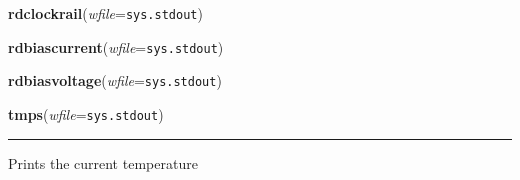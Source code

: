     \vspace{0.5ex}

    \begin{boxedminipage}{\textwidth}

    \raggedright \textbf{rdclockrail}(\textit{wfile}=\texttt{sys.stdout})

    \end{boxedminipage}

    \label{words:rdbiascurrent}

    \vspace{0.5ex}

    \begin{boxedminipage}{\textwidth}

    \raggedright \textbf{rdbiascurrent}(\textit{wfile}=\texttt{sys.stdout})

    \end{boxedminipage}

    \label{words:rdbiasvoltage}

    \vspace{0.5ex}

    \begin{boxedminipage}{\textwidth}

    \raggedright \textbf{rdbiasvoltage}(\textit{wfile}=\texttt{sys.stdout})

    \end{boxedminipage}

    \label{words:tmps}

    \vspace{0.5ex}

    \begin{boxedminipage}{\textwidth}

    \raggedright \textbf{tmps}(\textit{wfile}=\texttt{sys.stdout})

    \vspace{-1.5ex}

    \rule{\textwidth}{0.5\fboxrule}
    Prints the current temperature

    \vspace{1ex}

    \end{boxedminipage}

    \label{words:words}

